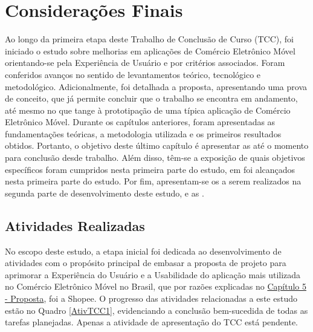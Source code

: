 \chapter{Considerações Finais}
    \label{chap:ConsideracoesFinais}

Ao longo da primeira etapa deste Trabalho de Conclusão de Curso (TCC), foi iniciado o estudo sobre melhorias em aplicações de Comércio Eletrônico Móvel orientando-se pela Experiência de Usuário e por critérios associados. Foram conferidos avanços no sentido de levantamentos teórico, tecnológico e metodológico. Adicionalmente, foi detalhada a proposta, apresentando uma prova de conceito, que já permite concluir que o trabalho se encontra em andamento, até mesmo no que tange à prototipação de uma típica aplicação de Comércio Eletrônico Móvel. Durante os capítulos anteriores, foram apresentadas as fundamentações teóricas, a metodologia utilizada e os primeiros resultados obtidos. Portanto, o objetivo deste último capítulo é apresentar as  até o momento para conclusão desde trabalho. Além disso, têm-se a exposição de quais objetivos específicos foram cumpridos nesta primeira parte do estudo, em  foi alcançados nesta primeira parte do estudo. Por fim, apresentam-se os  a serem realizados na segunda parte de desenvolvimento deste estudo, e as .

\section{Atividades Realizadas}
\label{ativrea}

No escopo deste estudo, a etapa inicial foi dedicada ao desenvolvimento de atividades com o propósito principal de embasar a proposta de projeto para aprimorar a Experiência do Usuário e a Usabilidade do aplicação mais utilizada no Comércio Eletrônico Móvel no Brasil, que por razões explicadas no \hyperref[chap:Proposta]{Capítulo 5 - Proposta}, foi a Shopee. O progresso das atividades relacionadas a este estudo estão no Quadro \ref{AtivTCC1}, evidenciando a conclusão bem-sucedida de todas as tarefas planejadas. Apenas a atividade de apresentação do TCC está pendente.

